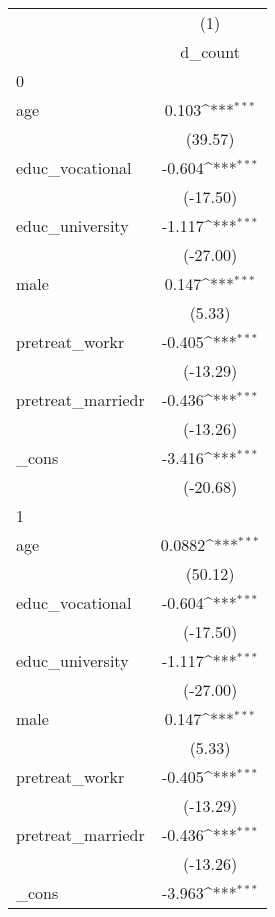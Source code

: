 {
\def\sym#1{\ifmmode^{#1}\else\(^{#1}\)\fi}
\begin{tabular}{l*{1}{c}}
\hline\hline
            &\multicolumn{1}{c}{(1)}\\
            &\multicolumn{1}{c}{d\_count}\\
\hline
0           &                     \\
age         &       0.103\sym{***}\\
            &     (39.57)         \\
[1em]
educ\_vocational&      -0.604\sym{***}\\
            &    (-17.50)         \\
[1em]
educ\_university&      -1.117\sym{***}\\
            &    (-27.00)         \\
[1em]
male        &       0.147\sym{***}\\
            &      (5.33)         \\
[1em]
pretreat\_workr&      -0.405\sym{***}\\
            &    (-13.29)         \\
[1em]
pretreat\_marriedr&      -0.436\sym{***}\\
            &    (-13.26)         \\
[1em]
\_cons      &      -3.416\sym{***}\\
            &    (-20.68)         \\
\hline
1           &                     \\
age         &      0.0882\sym{***}\\
            &     (50.12)         \\
[1em]
educ\_vocational&      -0.604\sym{***}\\
            &    (-17.50)         \\
[1em]
educ\_university&      -1.117\sym{***}\\
            &    (-27.00)         \\
[1em]
male        &       0.147\sym{***}\\
            &      (5.33)         \\
[1em]
pretreat\_workr&      -0.405\sym{***}\\
            &    (-13.29)         \\
[1em]
pretreat\_marriedr&      -0.436\sym{***}\\
            &    (-13.26)         \\
[1em]
\_cons      &      -3.963\sym{***}\\

\end{tabular}}
